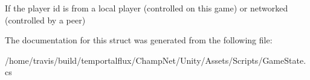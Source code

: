 If the player id is from a local player (controlled on this game) or networked (controlled by a peer) 



The documentation for this struct was generated from the following file\-:\begin{DoxyCompactItemize}
\item 
/home/travis/build/temportalflux/\-Champ\-Net/\-Unity/\-Assets/\-Scripts/Game\-State.\-cs\end{DoxyCompactItemize}
